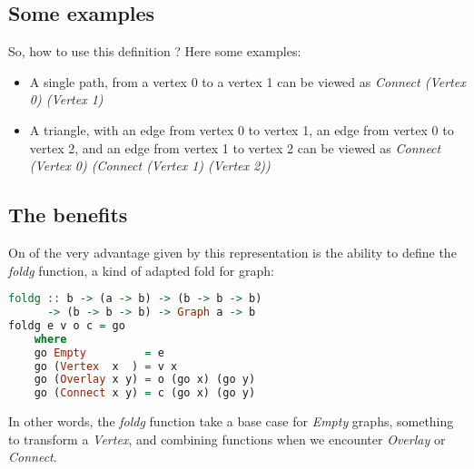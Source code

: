 \documentclass[10pt,a4paper]{article}
\begin{document}
\subsection{Some examples}

So, how to use this definition ? Here some examples:

\begin{itemize}
	\item A single path, from a vertex 0 to a vertex 1 can be viewed as \emph{Connect (Vertex 0) (Vertex 1)} %
	\item A triangle, with an edge from vertex 0 to vertex 1, an edge from vertex 0 to vertex 2, and an edge from vertex 1 to vertex 2 can be viewed as \emph{Connect (Vertex 0) (Connect (Vertex 1) (Vertex 2))} %
\end{itemize}

\subsection{The benefits}
On of the very advantage given by this representation is the ability to define the \emph{foldg} function, a kind of adapted fold for graph:
\begin{lstlisting}[language=Haskell, frame=single]
foldg :: b -> (a -> b) -> (b -> b -> b)
      -> (b -> b -> b) -> Graph a -> b
foldg e v o c = go
	where
	go Empty         = e
	go (Vertex  x  ) = v x
	go (Overlay x y) = o (go x) (go y)
	go (Connect x y) = c (go x) (go y)
\end{lstlisting}
In other words, the \emph{foldg} function take a base case for \emph{Empty} graphs, something to transform a \emph{Vertex}, and combining functions when we encounter \emph{Overlay} or \emph{Connect}.
\end{document}
